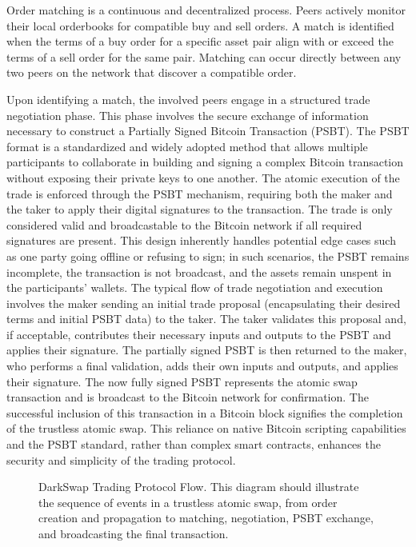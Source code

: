 \documentclass{article}
\begin{document}
Order matching is a continuous and decentralized process. Peers actively monitor their local orderbooks for compatible buy and sell orders. A match is identified when the terms of a buy order for a specific asset pair align with or exceed the terms of a sell order for the same pair. Matching can occur directly between any two peers on the network that discover a compatible order.

Upon identifying a match, the involved peers engage in a structured trade negotiation phase. This phase involves the secure exchange of information necessary to construct a Partially Signed Bitcoin Transaction (PSBT). The PSBT format is a standardized and widely adopted method that allows multiple participants to collaborate in building and signing a complex Bitcoin transaction without exposing their private keys to one another. The atomic execution of the trade is enforced through the PSBT mechanism, requiring both the maker and the taker to apply their digital signatures to the transaction. The trade is only considered valid and broadcastable to the Bitcoin network if all required signatures are present. This design inherently handles potential edge cases such as one party going offline or refusing to sign; in such scenarios, the PSBT remains incomplete, the transaction is not broadcast, and the assets remain unspent in the participants' wallets. The typical flow of trade negotiation and execution involves the maker sending an initial trade proposal (encapsulating their desired terms and initial PSBT data) to the taker. The taker validates this proposal and, if acceptable, contributes their necessary inputs and outputs to the PSBT and applies their signature. The partially signed PSBT is then returned to the maker, who performs a final validation, adds their own inputs and outputs, and applies their signature. The now fully signed PSBT represents the atomic swap transaction and is broadcast to the Bitcoin network for confirmation. The successful inclusion of this transaction in a Bitcoin block signifies the completion of the trustless atomic swap. This reliance on native Bitcoin scripting capabilities and the PSBT standard, rather than complex smart contracts, enhances the security and simplicity of the trading protocol.

\begin{figure}[h!]
    \centering
    \caption{DarkSwap Trading Protocol Flow. This diagram should illustrate the sequence of events in a trustless atomic swap, from order creation and propagation to matching, negotiation, PSBT exchange, and broadcasting the final transaction.}
    \label{fig:trading_protocol}
\end{figure}
\end{document}
